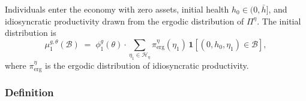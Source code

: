 \documentclass[12pt,a4paper]{article}
\begin{document}
Individuals enter the economy with zero assets, initial health $h_0 \in (0,\bar h]$, and idiosyncratic productivity drawn from the ergodic distribution of $\Pi^\eta$. The initial distribution is
\begin{equation}
\label{eq:initial_dist}
\mu_1^{g,\theta}(\mathcal{B})
\;=\;
\phi_{1}^{g}(\theta) \cdot
\sum_{\eta_1 \in \mathcal{H}_\eta} \pi^\eta_{\mathrm{erg}}(\eta_1)\,
\mathbf{1}[(0, h_0, \eta_1) \in \mathcal{B}],
\end{equation}
where $\pi^\eta_{\mathrm{erg}}$ is the ergodic distribution of idiosyncratic productivity.


\subsubsection{Definition}
\end{document}
